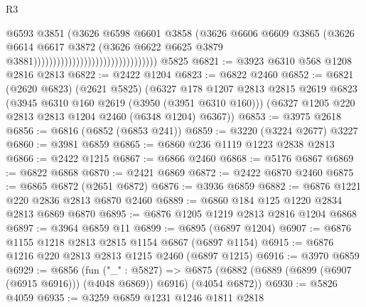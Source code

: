 \begin{lexlean}{R3}
\begin{coremodule}
                                                            @6593
                                                            @3851
                                                            (@3626
                                                              @6598
                                                              @6601
                                                              @3858
                                                              (@3626
                                                                @6606
                                                                @6609
                                                                @3865
                                                                (@3626
                                                                  @6614
                                                                  @6617
                                                                  @3872
                                                                  (@3626
                                                                    @6622
                                                                    @6625
                                                                    @3879
                                                                    @3881))))))))))))))))))))))))))))))))
    @5825
@6821 := @3923 @6310 @568 @1208 @2816 @2813
@6822 := @2422 @1204
@6823 := @6822 @2460
@6852 := @6821
    (@2620 @6823)
    (@2621 @5825)
    (@6327
      @178
      @1207
      @2813
      @2815
      @2619
      @6823
      (@3945 @6310 @160 @2619 (@3950 (@3951 @6310 @160)))
      (@6327 @1205 @220 @2813 @2813 @1204 @2460 (@6348 @1204) @6367))
@6853 := @3975 @2618
@6856 := @6816 (@6852 (@6853 @241))
@6859 := @3220 (@3224 @2677) @3227
@6860 := @3981 @6859
@6865 := @6860 @236 @1119 @1223 @2838 @2813
@6866 := @2422 @1215
@6867 := @6866 @2460
@6868 := @5176 @6867
@6869 := @6822 @6868
@6870 := @2421 @6869
@6872 := @2422 @6870 @2460
@6875 := @6865 @6872 (@2651 @6872)
@6876 := @3936 @6859
@6882 := @6876 @1221 @220 @2836 @2813 @6870 @2460
@6889 := @6860 @184 @125 @1220 @2834 @2813 @6869 @6870
@6895 := @6876 @1205 @1219 @2813 @2816 @1204 @6868
@6897 := @3964 @6859 @11
@6899 := @6895 (@6897 @1204)
@6907 := @6876 @1155 @1218 @2813 @2815 @1154 @6867 (@6897 @1154)
@6915 := @6876 @1216 @220 @2813 @2813 @1215 @2460 (@6897 @1215)
@6916 := @3970 @6859
@6929 := @6856
    (fun ("_" : @5827) =>
    @6875 (@6882 (@6889 (@6899 (@6907 (@6915 @6916))) (@4048 @6869)) @6916) (@4054 @6872))
@6930 := @5826 @4059
@6935 := @3259 @6859 @1231 @1246 @1811 @2818

\end{coremodule}
\end{lexlean}

